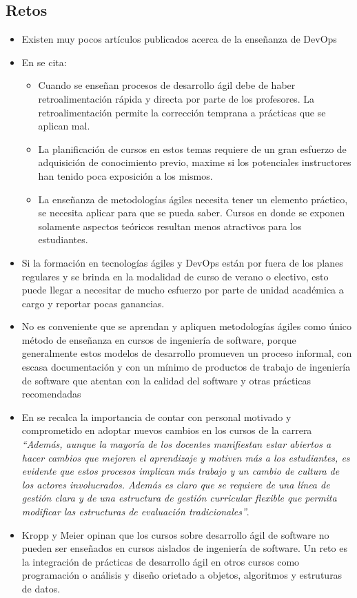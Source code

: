 \documentclass[journal]{IEEEtran}
\begin{document}
\subsection{Retos}
\begin{itemize}
    \item Existen muy pocos artículos publicados acerca de la enseñanza de DevOps\cite{henrik-b}
    \item En \cite{steghoger-et-al} se cita:
        \begin{itemize}
            \item Cuando se enseñan procesos de desarrollo ágil debe de haber retroalimentación rápida y directa por parte de los profesores. La retroalimentación permite la corrección temprana a prácticas que se aplican mal.
            \item La planificación de cursos en estos temas requiere de un gran esfuerzo de adquisición de conocimiento previo, maxime si los potenciales instructores han tenido poca exposición a los mismos.
            \item La enseñanza de metodologías ágiles necesita tener un elemento práctico, se necesita aplicar para que se pueda saber. Cursos en donde se exponen solamente aspectos teóricos resultan menos atractivos para los estudiantes. 
        \end{itemize} 
        
        \item Si la formación en tecnologías ágiles y DevOps están por fuera de los planes regulares y se brinda en la modalidad de curso de verano o electivo, esto puede llegar a necesitar de mucho esfuerzo por parte de unidad académica a cargo y reportar pocas ganancias\cite{hickey-salas}.
        \item No es conveniente que se aprendan y apliquen metodologías ágiles como único método de enseñanza en cursos de ingeniería de software, porque generalmente estos modelos de desarrollo promueven un proceso informal, con escasa documentación y con un mínimo de productos de trabajo de ingeniería de software que atentan con la calidad del software y otras prácticas recomendadas\cite{salazar}
        \item En \cite{mora-et-al-1} se recalca la importancia de contar con personal motivado y comprometido en adoptar nuevos cambios en los cursos de la carrera \emph{``Además, aunque la mayoría de los docentes manifiestan estar abiertos a hacer cambios que mejoren el aprendizaje y motiven más a los estudiantes, es evidente que estos procesos implican más trabajo y un cambio de cultura de los actores involucrados. Además es claro que se requiere de una línea de gestión clara y de una estructura de gestión curricular flexible que permita modificar las estructuras de evaluación tradicionales''}.
        \item Kropp y Meier \cite{kropp-meier-1} opinan que los cursos sobre desarrollo ágil de software no pueden ser enseñados en cursos aislados de ingeniería de software. Un reto es la integración de prácticas de desarrollo ágil en otros cursos como programación o análisis y diseño orietado a objetos, algoritmos y estruturas de datos.
\end{itemize}
\end{document}

